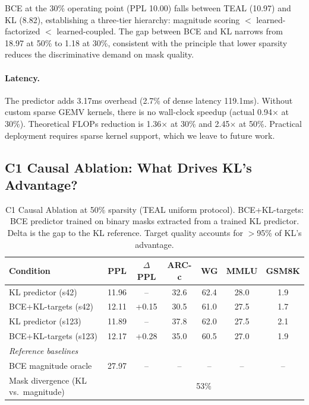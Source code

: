 \documentclass[11pt,a4paper]{article}
\begin{document}
BCE at the 30\% operating point (PPL 10.00) falls between TEAL (10.97) and KL (8.82), establishing a three-tier hierarchy: magnitude scoring $<$ learned-factorized $<$ learned-coupled. The gap between BCE and KL narrows from 18.97 at 50\% to 1.18 at 30\%, consistent with the principle that lower sparsity reduces the discriminative demand on mask quality.

\paragraph{Latency.} The predictor adds 3.17ms overhead (2.7\% of dense latency 119.1ms). Without custom sparse GEMV kernels, there is no wall-clock speedup (actual 0.94$\times$ at 30\%). Theoretical FLOPs reduction is 1.36$\times$ at 30\% and 2.45$\times$ at 50\%. Practical deployment requires sparse kernel support, which we leave to future work.

\subsection{C1 Causal Ablation: What Drives KL's Advantage?}
\label{sec:c1}

\begin{table}[t]
\centering
\caption{C1 Causal Ablation at 50\% sparsity (TEAL uniform protocol). BCE+KL-targets: BCE predictor trained on binary masks extracted from a trained KL predictor. Delta is the gap to the KL reference. Target quality accounts for $>$95\% of KL's advantage.}
\label{tab:c1}
\small
\begin{tabular}{lcccccc}
\toprule
\textbf{Condition} & \textbf{PPL} & \textbf{$\Delta$PPL} & \textbf{ARC-c} & \textbf{WG} & \textbf{MMLU} & \textbf{GSM8K} \\
\midrule
KL predictor (s42) & 11.96 & -- & 32.6 & 62.4 & 28.0 & 1.9 \\
BCE+KL-targets (s42) & 12.11 & +0.15 & 30.5 & 61.0 & 27.5 & 1.7 \\
\midrule
KL predictor (s123) & 11.89 & -- & 37.8 & 62.0 & 27.5 & 2.1 \\
BCE+KL-targets (s123) & 12.17 & +0.28 & 35.0 & 60.5 & 27.0 & 1.9 \\
\midrule
\multicolumn{7}{l}{\emph{Reference baselines}} \\
BCE magnitude oracle & 27.97 & -- & -- & -- & -- & -- \\
Mask divergence (KL vs.\ magnitude) & \multicolumn{6}{c}{53\%} \\
\bottomrule
\end{tabular}
\end{table}
\end{document}
